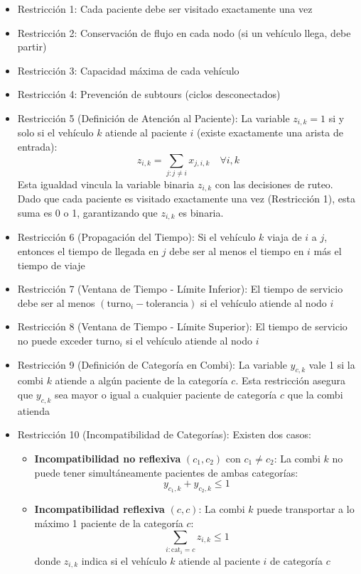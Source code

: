 \documentclass[12pt]{article}
\begin{document}
\begin{itemize}
    \item Restricción 1: Cada paciente debe ser visitado exactamente una vez
    
    \item Restricción 2: Conservación de flujo en cada nodo (si un vehículo llega, debe partir)
    
    \item Restricción 3: Capacidad máxima de cada vehículo
    
    \item Restricción 4: Prevención de subtours (ciclos desconectados)
    
    \item Restricción 5 (Definición de Atención al Paciente): La variable $z_{i,k} = 1$ si y solo si el vehículo $k$ atiende al paciente $i$ (existe exactamente una arista de entrada):
    \[
    z_{i,k} = \sum_{j: j \ne i} x_{j,i,k} \quad \forall i,k
    \]
    Esta igualdad vincula la variable binaria $z_{i,k}$ con las decisiones de ruteo. Dado que cada paciente es visitado exactamente una vez (Restricción 1), esta suma es 0 o 1, garantizando que $z_{i,k}$ es binaria.
    
    \item Restricción 6 (Propagación del Tiempo): Si el vehículo $k$ viaja de $i$ a $j$, entonces el tiempo de llegada en $j$ debe ser al menos el tiempo en $i$ más el tiempo de viaje
    
    \item Restricción 7 (Ventana de Tiempo - Límite Inferior): El tiempo de servicio debe ser al menos $(\text{turno}_i - \text{tolerancia})$ si el vehículo atiende al nodo $i$
    
    \item Restricción 8 (Ventana de Tiempo - Límite Superior): El tiempo de servicio no puede exceder $\text{turno}_i$ si el vehículo atiende al nodo $i$
    
    \item Restricción 9 (Definición de Categoría en Combi): La variable $y_{c,k}$ vale 1 si la combi $k$ atiende a algún paciente de la categoría $c$. Esta restricción asegura que $y_{c,k}$ sea mayor o igual a cualquier paciente de categoría $c$ que la combi atienda
    
    \item Restricción 10 (Incompatibilidad de Categorías): Existen dos casos:
    \begin{itemize}
        \item \textbf{Incompatibilidad no reflexiva} $(c_1, c_2)$ con $c_1 \ne c_2$: La combi $k$ no puede tener simultáneamente pacientes de ambas categorías:
        \[
        y_{c_1,k} + y_{c_2,k} \leq 1
        \]
        \item \textbf{Incompatibilidad reflexiva} $(c, c)$: La combi $k$ puede transportar a lo máximo 1 paciente de la categoría $c$:
        \[
        \sum_{i: \text{cat}_i = c} z_{i,k} \leq 1
        \]
        donde $z_{i,k}$ indica si el vehículo $k$ atiende al paciente $i$ de categoría $c$
    \end{itemize}
\end{itemize}
\end{document}
